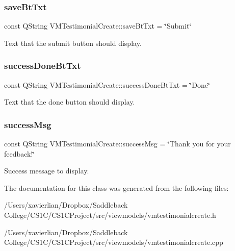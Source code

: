 \subsubsection{\texorpdfstring{saveBtTxt}{saveBtTxt}}
{\footnotesize\ttfamily const Q\+String V\+M\+Testimonial\+Create\+::save\+Bt\+Txt = \char`\"{}Submit\char`\"{}}

Text that the submit button should display. \mbox{\label{class_v_m_testimonial_create_afe5812a327160651286af17f65c62416}} 
\subsubsection{\texorpdfstring{successDoneBtTxt}{successDoneBtTxt}}
{\footnotesize\ttfamily const Q\+String V\+M\+Testimonial\+Create\+::success\+Done\+Bt\+Txt = \char`\"{}Done\char`\"{}}

Text that the done button should display. \mbox{\label{class_v_m_testimonial_create_ad496e34b013e7d4ee879f8bc8eaa434b}} 
\subsubsection{\texorpdfstring{successMsg}{successMsg}}
{\footnotesize\ttfamily const Q\+String V\+M\+Testimonial\+Create\+::success\+Msg = \char`\"{}Thank you for your feedback!\char`\"{}}

Success message to display. 

The documentation for this class was generated from the following files\+:\begin{DoxyCompactItemize}
\item 
/\+Users/xavierlian/\+Dropbox/\+Saddleback College/\+C\+S1\+C/\+C\+S1\+C\+Project/src/viewmodels/vmtestimonialcreate.\+h\item 
/\+Users/xavierlian/\+Dropbox/\+Saddleback College/\+C\+S1\+C/\+C\+S1\+C\+Project/src/viewmodels/vmtestimonialcreate.\+cpp\end{DoxyCompactItemize}
